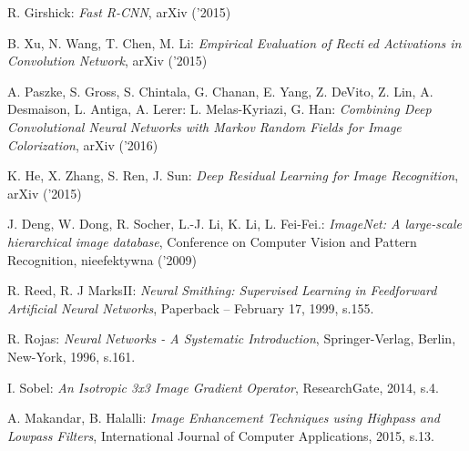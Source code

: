 \begin{thebibliography}{99}
   R. Girshick:
  \emph{Fast R-CNN},
  arXiv ('2015)

   B. Xu, N. Wang, T. Chen, M. Li:
  \emph{Empirical Evaluation of Rectied Activations in Convolution Network},
   arXiv ('2015)

    A. Paszke, S. Gross, S. Chintala, G. Chanan,
   E. Yang, Z. DeVito, Z. Lin, A. Desmaison, L. Antiga, A. Lerer:
    L. Melas-Kyriazi, G. Han:
   \emph{Combining Deep Convolutional Neural Networks with Markov Random
   Fields for Image Colorization}, arXiv ('2016)

    K. He, X. Zhang, S. Ren, J. Sun:
   \emph{Deep Residual Learning for Image Recognition}, arXiv ('2015)

   J. Deng, W. Dong, R. Socher, L.-J. Li, K. Li, L. Fei-Fei.:
   \emph{ImageNet: A large-scale hierarchical image database}, Conference on Computer Vision and Pattern Recognition, nieefektywna ('2009)

    R. Reed,  R. J MarksII:
  \emph{Neural Smithing: Supervised Learning in Feedforward Artificial Neural Networks},
  Paperback – February 17, 1999, s.155.

   R. Rojas:
  \emph{Neural Networks - A Systematic Introduction},
  Springer-Verlag, Berlin, New-York, 1996, s.161.

   I. Sobel:
  \emph{An Isotropic 3x3 Image Gradient Operator},
  ResearchGate, 2014, s.4.

   A. Makandar, B. Halalli:
  \emph{Image Enhancement Techniques using Highpass and Lowpass Filters},
  International Journal of Computer Applications, 2015, s.13.

\end{thebibliography}
